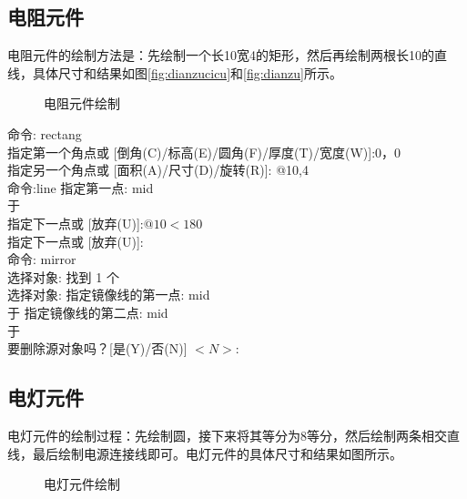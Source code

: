 \subsection{电阻元件}
电阻元件的绘制方法是：先绘制一个长10宽4的矩形，然后再绘制两根长10的直线，具体尺寸和结果如图\ref{fig:dianzucicu}和\ref{fig:dianzu}所示。

\noindent
\begin{figure}[htbp]
\centering
{}\hspace{30pt}
\caption{电阻元件绘制}
\end{figure}

\noindent
命令: rectang\\
指定第一个角点或 [倒角(C)/标高(E)/圆角(F)/厚度(T)/宽度(W)]:0，0\\
指定另一个角点或 [面积(A)/尺寸(D)/旋转(R)]: @10,4\\
命令:line 指定第一点: mid\\
于\\
指定下一点或 [放弃(U)]:$ @10<180$\\
指定下一点或 [放弃(U)]:\\
命令: mirror\\
选择对象: 找到 1 个\\
选择对象:  指定镜像线的第一点: mid\\
于 指定镜像线的第二点: mid\\
于\\
要删除源对象吗？[是(Y)/否(N)] $<N>:$\\

\subsection{电灯元件}
电灯元件的绘制过程：先绘制圆，接下来将其等分为8等分，然后绘制两条相交直线，最后绘制电源连接线即可。电灯元件的具体尺寸和结果如图所示。

\noindent
\begin{figure}[htbp]
\centering
{}\hspace{30pt}
\hspace{30pt}
\hspace{30pt}
\caption{电灯元件绘制}
\end{figure}

